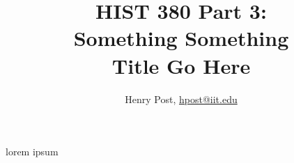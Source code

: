 \documentclass[a4paper,12pt]{article}
\title{HIST 380 Part 3: \\ Something Something \\ Title Go Here }
\author{Henry Post, \url{hpost@iit.edu}}
\begin{document}
\maketitle

\newpage

lorem ipsum

\newpage

\begin{thebibliography}{9}


\end{thebibliography}

\newpage

\end{document}
